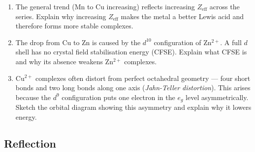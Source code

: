 \documentclass[12pt, a4paper]{book}
\newcommand{\newterm}[1]{\textit{\textcolor{DiscoveryColor}{#1}}}
\begin{document}
\begin{deepbox}
\begin{enumerate}[label=\textbf{D\arabic*.}]
        \begin{enumerate}[label=(\alph*)]
          \item The general trend (Mn to Cu increasing) reflects
                increasing $Z_\text{eff}$ across the series.
                Explain why increasing $Z_\text{eff}$ makes
                the metal a better Lewis acid and therefore
                forms more stable complexes.
          \item The drop from Cu to Zn is caused by the
                $d^{10}$ configuration of Zn$^{2+}$.
                A full $d$ shell has no crystal field
                stabilisation energy (CFSE).
                Explain what CFSE is and why its absence
                weakens Zn$^{2+}$ complexes.
          \item Cu$^{2+}$ complexes often distort from perfect
                octahedral geometry --- four short bonds
                and two long bonds along one axis
                (\newterm{Jahn-Teller distortion}).
                This arises because the $d^9$ configuration
                puts one electron in the $e_g$ level
                asymmetrically.
                Sketch the orbital diagram showing this
                asymmetry and explain why it lowers energy.
        \end{enumerate}

\end{enumerate}
\end{deepbox}

\subsection*{Reflection}
\end{document}
